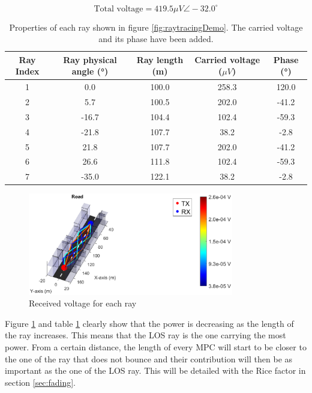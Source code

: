 \documentclass[10pt,a4paper]{ULBreport}
\begin{document}
\begin{equation*}
    \text{Total voltage} = 419.5 \mu V \angle -32.0^\circ
\end{equation*}

\begin{table}[H]
    \centering
    \begin{tabular}{|c|c c c c|}
        \hline
        Ray Index & Ray physical angle (°) & Ray length (m) & Carried voltage ($\mu V$) & Phase (°) \\ \hline
        1 & 0.0 & 100.0 & 258.3 & 120.0\\ \hline
        2 & 5.7 & 100.5 & 202.0 & -41.2\\ \hline
        3 & -16.7 & 104.4 & 102.4 & -59.3\\ \hline
        4 & -21.8 & 107.7 & 38.2 & -2.8\\ \hline
        5 & 21.8 & 107.7 & 202.0 & -41.2\\ \hline
        6 & 26.6 & 111.8 & 102.4 & -59.3\\ \hline
        7 & -35.0 & 122.1 & 38.2 & -2.8\\ \hline
    \end{tabular}
    \caption{Properties of each ray shown in figure \ref{fig:raytracingDemo}. The carried voltage and its phase have been added.}
    \label{tab:ray_properties}
\end{table}

\begin{figure}
    \centering
    \includegraphics[width=0.8\textwidth]{3_2.eps}
    \caption{Received voltage for each ray}
    \label{fig:voltageDemo}
\end{figure}

Figure \ref{fig:voltageDemo} and table \ref{tab:ray_properties} clearly show that the power is decreasing as the length of the ray increases. This means that the LOS ray is the one carrying the most power. From a certain distance, the length of every MPC will start to be closer to the one of the ray that does not bounce and their contribution will then be as important as the one of the LOS ray. This will be detailed with the Rice factor in section \ref{sec:fading}.
\end{document}
